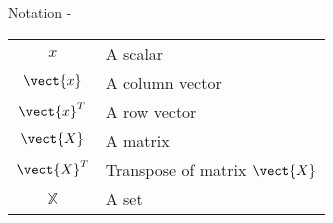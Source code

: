 
\begin{frame}[allowframebreaks,t]{Notation -}

\begin{tabular}{cl}

$x$             & A scalar \\
$\vect{x}$      & A column vector \\
$\vect{x}^T$    & A row vector \\
$\vect{X}$      & A matrix \\
$\vect{X}^T$    & Transpose of matrix  $\vect{X}$ \\
$\mathbb{X}$    & A set \\

\end{tabular}

\end{frame}
